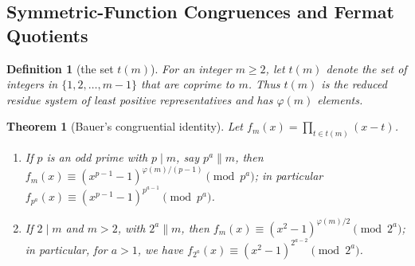 \documentclass[11pt]{article}
\theoremstyle{ntstyle}
\newtheorem{theorem}{Theorem}[subsection]
\newtheorem{definition}{Definition}[subsection]
\begin{document}
\subsection{Symmetric-Function Congruences and Fermat Quotients}

\begin{definition}[the set $t(m)$]\label{def:6.9.1}\label{def:the-set-t-m}
  For an integer $m\ge2$, let $t(m)$ denote the set of integers in
  $\{1,2,\ldots,m-1\}$ that are coprime to $m$. Thus $t(m)$ is the
  reduced residue system of least positive representatives and has
  $\varphi(m)$ elements.

\end{definition}

\begin{theorem}[Bauer's congruential identity]\label{thm:6.9.1}\label{thm:bauer-congruential-identity}
  Let
  $f_m(x) = \prod_{t \in t(m)}(x - t)$.

  \begin{enumerate}[label={\alph*)}]
    \item If $p$ is an odd prime with $p\mid m$, say $p^{a} \parallel m$, then
    $f_m(x) \equiv (x^{p-1} - 1)^{\varphi(m)/(p-1)} \pmod{p^{a}}$; in particular
          $f_{p^{a}}(x) \equiv (x^{p-1} - 1)^{p^{a-1}} \pmod{p^{a}}$.
    \item If $2 \mid m$ and $m > 2$, with $2^{a} \parallel m$, then
    $f_m(x) \equiv (x^{2} - 1)^{\varphi(m)/2} \pmod{2^{a}}$; in particular, for
          $a > 1$, we have $f_{2^{a}}(x) \equiv (x^{2} - 1)^{2^{a-2}} \pmod{2^{a}}$.
  \end{enumerate}

\end{theorem}
\end{document}
